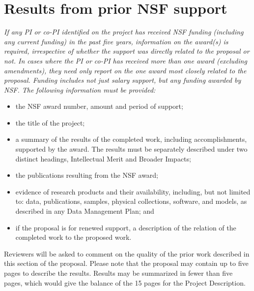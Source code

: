 
\section{Results from prior NSF support}

{\em If any PI or co-PI identified on the project has received NSF funding (including any current funding) in the past five years, information on the award(s) is required, irrespective of whether the support was directly related to the proposal or not. In cases where the PI or co-PI has received more than one award (excluding amendments), they need only report on the one award most closely related to the proposal. Funding includes not just salary support, but any funding awarded by NSF. The following information must be provided:

\begin{itemize}

\item the NSF award number, amount and period of support;

\item the title of the project;

\item a summary of the results of the completed work, including accomplishments, supported by the award. The results must be separately described under two distinct headings, Intellectual Merit and Broader Impacts;

\item the publications resulting from the NSF award;

\item evidence of research products and their availability, including, but not limited to: data, publications, samples, physical collections, software, and models, as described in any Data Management Plan; and

\item if the proposal is for renewed support, a description of the relation of the completed work to the proposed work.

\end{itemize}

Reviewers will be asked to comment on the quality of the prior work described in this section of the proposal. Please note that the proposal may contain up to five pages to describe the results. Results may be summarized in fewer than five pages, which would give the balance of the 15 pages for the Project Description.

}

